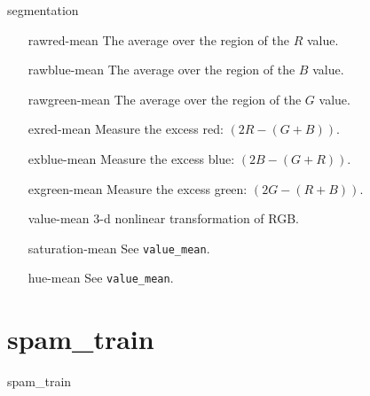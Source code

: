 \begin{datasetDescription}{segmentation}
{\begin{itemize}
                \ensuremath{\left(R+G+B\right)/3}
            \item[rawred-mean] The average over the region of the
                \ensuremath{R} value.
            \item[rawblue-mean] The average over the region of the
                \ensuremath{B} value.
            \item[rawgreen-mean] The average over the region of the
                \ensuremath{G} value.
            \item[exred-mean] Measure the excess red:
                \ensuremath{\left(2R-\left(G+B\right)\right)}.
            \item[exblue-mean] Measure the excess blue:
                \ensuremath{\left(2B-\left(G+R\right)\right)}.
            \item[exgreen-mean] Measure the excess green:
                \ensuremath{\left(2G-\left(R+B\right)\right)}.
            \item[value-mean] 3-d nonlinear transformation of RGB.
            \item[saturation-mean] See \lstinline+value_mean+.
            \item[hue-mean] See \lstinline+value_mean+.
        \end{itemize}
    }
\end{datasetDescription}

\section{spam\_train}
\label{sec:datasets:spam_train}
\begin{datasetDescription}{spam_train}
\end{datasetDescription}

